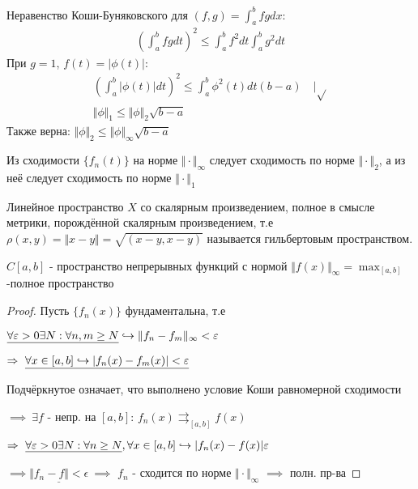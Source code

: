 \documentclass{article}
\begin{document}
Неравенство Коши-Буняковского для $(f,g)=\int_{a}^{b}fgdx$:
\begin{gather*}
  \left( \int_{a}^{b}fgdt\right)^{2}\le \int_{a}^{b}f^{2}dt\int_{a}^{b}g^{2}dt
\end{gather*}
При $g=1$, $f(t)=|\phi(t)|$:
\begin{gather*}
  \left(\int_{a}^{b}|\phi(t)|dt\right)^{2} \le \int_{a}^{b}\phi^{2}(t)dt (b-a) \quad \Big|\sqrt{} \\
  \Vert \phi \Vert_1 \le \Vert \phi \Vert_{2}\sqrt{b-a}
\end{gather*}
Также верна: $\Vert \phi \Vert_{2}\le \Vert \phi \Vert_{\infty}\sqrt{b-a}$
 
\begin{theorem}
  Из сходимости $\{f_n(t)\}$ на норме $\Vert \cdot \Vert_{\infty}$ следует сходимость
  по норме $\Vert \cdot \Vert_{2}$, а из неё следует сходимость по норме $\Vert \cdot \Vert_{1}$
\end{theorem}
\begin{definition}
  Линейное пространство $X$ со скалярным произведением, полное в смысле метрики,
  порождённой скалярным произведением, т.е $\rho(x,y)=\Vert x-y \Vert=\sqrt{(x-y,x-y)}$ 
  называется гильбертовым пространством.
\end{definition}
\begin{theorem}
  $C[a,b]$ - пространство непрерывных функций с нормой $\Vert f(x) \Vert_{\infty}=\max_{[a,b]}$
  -полное пространство
\end{theorem}
\begin{proof}
Пусть $\{f_{n}(x)\}$ фундаментальна, т.е 

$\underline{\forall \varepsilon > 0 \exists N: \forall n,m \ge N} \hookrightarrow \Vert f_n-f_m \Vert_{\infty}< \varepsilon$

$\Rightarrow \ \underline{\forall x \in [a,b] \hookrightarrow |f_n(x)-f_m(x)|<\varepsilon}$

Подчёркнутое означает, что выполнено условие Коши равномерной сходимости

$\implies \ \exists f$ - непр. на $[a,b]$: $f_n(x) \rightrightarrows_{[a,b]}f(x)$

$\Rightarrow \ \underline{\forall \varepsilon > 0 \exists N: \forall n\ge N}, \forall x \in [a,b] \hookrightarrow |f_n(x)-f(x)| \varepsilon$

$\implies \underline{\Vert f_n-f \Vert<\epsilon} \ \implies$ $f_n$ - сходится
по норме $\Vert \cdot \Vert_{\infty}$ $\implies$ полн. пр-ва
\end{proof}

\end{document}
